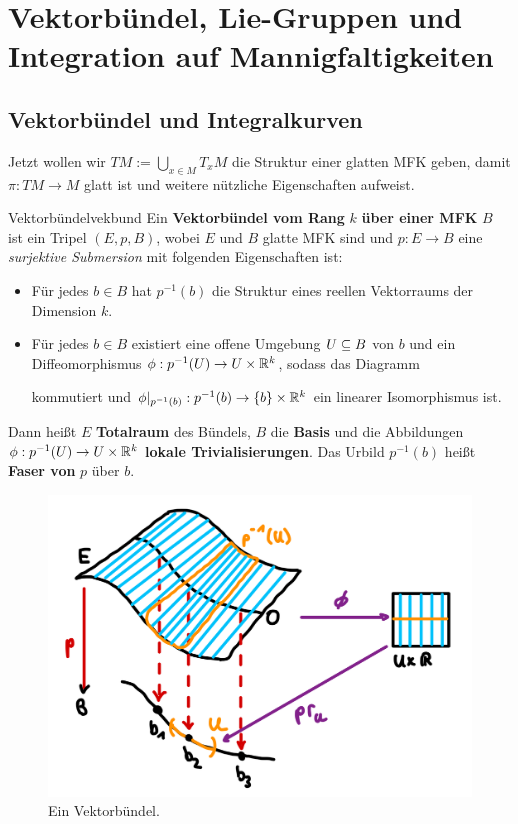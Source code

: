 \section{Vektorbündel, Lie-Gruppen und Integration auf Mannigfaltigkeiten}
\subsection{Vektorbündel und Integralkurven}
\label{subsec:tangentialbündel}
Jetzt wollen wir $TM := \bigcup_{x \in M} T_xM$ die Struktur einer glatten MFK geben, damit $\pi: TM \to M$ glatt ist und weitere nützliche Eigenschaften aufweist.
\begin{definition}{Vektorbündel}{vekbund}
Ein \textbf{Vektorbündel vom Rang} $k$ \textbf{über einer MFK} $B$ ist ein Tripel $(E, p, B)$, wobei $E$ und $B$ glatte MFK sind und $p: E \to B$ eine \textit{surjektive Submersion} mit folgenden Eigenschaften ist:
\begin{itemize}
\item Für jedes $b \in B$ hat $p^{-1}(b)$ die Struktur eines reellen Vektorraums der Dimension $k$.
\item Für jedes $b \in B$ existiert eine offene Umgebung $U \subseteq B$ von $b$ und ein Diffeomorphismus $\phi: p^{-1}(U) \to U \times \mathbb{R}^k$, sodass das Diagramm
\begin{center}
\end{center}
kommutiert und $\phi|_{p^{-1}(b)}:p^{-1}(b) \to \{b\} \times \mathbb{R}^k$ ein  linearer Isomorphismus ist.
\end{itemize}
Dann heißt $E$ \textbf{Totalraum} des Bündels, $B$ die \textbf{Basis} und die Abbildungen $\phi: p^{-1}(U) \to U \times \mathbb{R}^k$ \textbf{lokale Trivialisierungen}. Das Urbild $p^{-1}(b)$ heißt \textbf{Faser von} $p$ über $b$.
\begin{figure}[H]
\label{fig:vektorbuendel}
\centering
\includegraphics[width=0.3\linewidth]{Bilder/vektorbuendel.png}
\caption{Ein Vektorbündel.}
\end{figure}
\end{definition}

